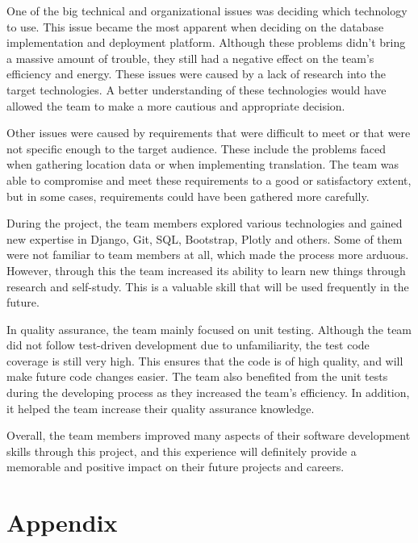 \documentclass{l3proj}
\begin{document}
One of the big technical and organizational issues was deciding which technology to use. This issue became the most apparent when deciding on the database implementation and deployment platform. Although these problems didn't bring a massive amount of trouble, they still had a negative effect on the team's efficiency and energy. These issues were caused by a lack of research into the target technologies. A better understanding of these technologies would have allowed the team to make a more cautious and appropriate decision.

Other issues were caused by requirements that were difficult to meet or that were not specific enough to the target audience. These include the problems faced when gathering location data or when implementing translation. The team was able to compromise and meet these requirements to a good or satisfactory extent, but in some cases, requirements could have been gathered more carefully.

During the project, the team members explored various technologies and gained new expertise in Django, Git, SQL, Bootstrap, Plotly and others. Some of them were not familiar to team members at all, which made the process more arduous. However, through this the team increased its ability to learn new things through research and self-study. This is a valuable skill that will be used frequently in the future.

In quality assurance, the team mainly focused on unit testing. Although the team did not follow test-driven development due to unfamiliarity, the test code coverage is still very high. This ensures that the code is of high quality, and will make future code changes easier. The team also benefited from the unit tests during the developing process as they increased the team's efficiency. In addition, it helped the team increase their quality assurance knowledge.

Overall, the team members improved many aspects of their software development skills through this project, and this experience will definitely provide a memorable and positive impact on their future projects and careers.





\newpage

\section{Appendix}
\label{appendix}
\appendix
\end{document}
